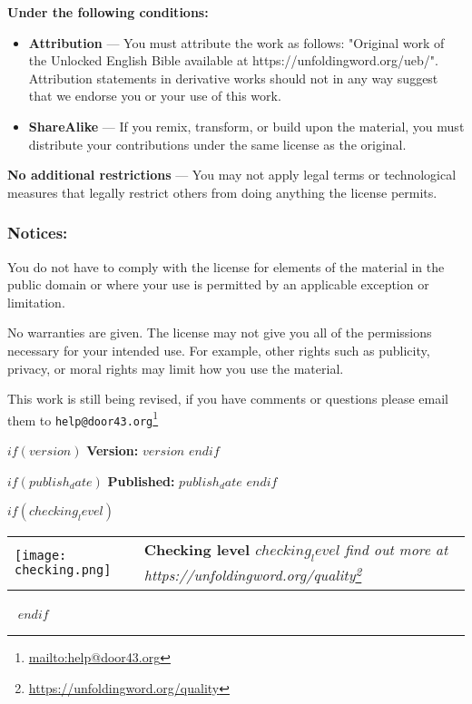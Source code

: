 \documentclass[$fontsize$pt,$if(lang)$$lang$,$endif$$if(papersize)$$papersize$,$endif$$for(classoption)$$classoption$$sep$,$endfor$,openany]{$documentclass$}
\renewcommand{\href}[2]{#2\footnote{\url{#1}}}
\begin{document}
\textbf{Under the following conditions:}

\begin{itemize}
\item \textbf{Attribution} — You must attribute the work as follows: "Original work of the Unlocked English Bible available at https://unfoldingword.org/ueb/". Attribution statements in derivative works should not in any way suggest that we endorse you or your use of this work.
\item \textbf{ShareAlike} — If you remix, transform, or build upon the material, you must distribute your contributions under the same license as the original.
\end{itemize}

\textbf{No additional restrictions} — You may not apply legal terms or technological measures that legally restrict others from doing anything the license permits.

\subsubsection{Notices:}

You do not have to comply with the license for elements of the material in the public domain or where your use is permitted by an applicable exception or limitation.

No warranties are given. The license may not give you all of the permissions necessary for your intended use. For example, other rights such as publicity, privacy, or moral rights may limit how you use the material.

This work is still being revised, if you have comments or questions please email them to \href{mailto:help@door43.org}{\nolinkurl{help@door43.org}}

\vspace{10 mm}

$if(version)$
  \textbf{Version:} $version$
$endif$

$if(publish_date)$
  \textbf{Published:} $publish_date$
$endif$

$if(checking_level)$
\begin{tabular}{@{}p{1.5cm} p{10cm}@{}}
    \vspace{0pt}
    \texttt{[image: checking.png]}
    &
    \vspace{0pt}
    \textbf{Checking level $checking_level$}
    \newline
    \newline
    \em{find out more at \href{https://unfoldingword.org/quality}{https://unfoldingword.org/quality}}
\end{tabular}
\hfill\
$endif$
\end{document}
